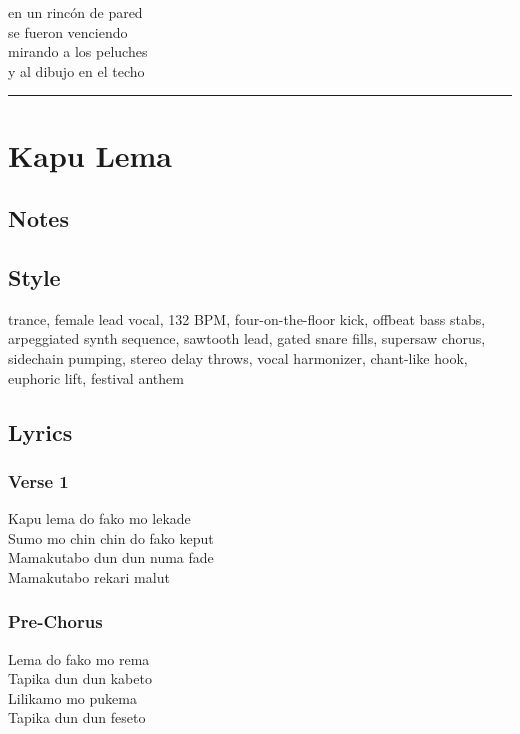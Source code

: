 en un rincón de pared\\
se fueron venciendo\\
mirando a los peluches\\
y al dibujo en el techo

\begin{center}\rule{0.5\linewidth}{0.5pt}\end{center}

\section{Kapu Lema}\label{kapu-lema}

\subsection{Notes}\label{notes-37}

\subsection{Style}\label{style-36}

trance, female lead vocal, 132 BPM, four-on-the-floor kick, offbeat bass
stabs, arpeggiated synth sequence, sawtooth lead, gated snare fills,
supersaw chorus, sidechain pumping, stereo delay throws, vocal
harmonizer, chant-like hook, euphoric lift, festival anthem

\subsection{Lyrics}\label{lyrics-36}

\subsubsection{Verse 1}\label{verse-1-19}

Kapu lema do fako mo lekade\\
Sumo mo chin chin do fako keput\\
Mamakutabo dun dun numa fade\\
Mamakutabo rekari malut

\subsubsection{Pre-Chorus}\label{pre-chorus-21}

Lema do fako mo rema\\
Tapika dun dun kabeto\\
Lilikamo mo pukema\\
Tapika dun dun feseto

